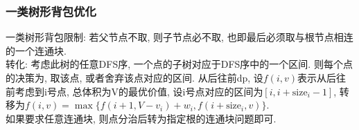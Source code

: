 \subsubsection{一类树形背包优化}
\noindent
一类树形背包限制: 若父节点不取, 则子节点必不取, 也即最后必须取与根节点相连的一个连通块.\\
转化: 考虑此树的任意DFS序, 一个点的子树对应于DFS序中的一个区间. 则每个点的决策为, 取该点, 或者舍弃该点对应的区间. 从后往前dp, 设$f(i, v)$表示从后往前考虑到i号点, 总体积为V的最优价值, 设i号点对应的区间为$[i,i+\mathrm{size}_i-1]$, 转移为$f(i, v)=\max\{f(i+1, V-v_i)+w_i, f(i+\mathrm{size}_i, v)\}$.\\
如果要求任意连通块, 则点分治后转为指定根的连通块问题即可.
